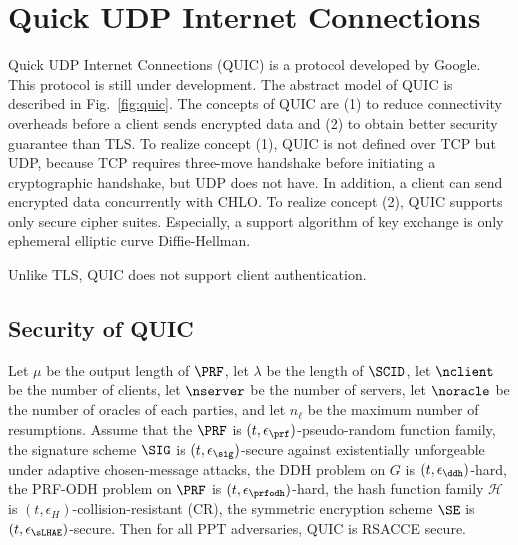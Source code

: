 \section{Quick UDP Internet Connections} \label{sec:quic}





Quick UDP Internet Connections (QUIC) is a protocol developed by Google. This protocol is still under development. The abstract model of QUIC is described in Fig.~\ref{fig:quic}. The concepts of QUIC are (1) to reduce connectivity overheads before a client sends encrypted data and (2) to obtain better security guarantee than TLS.
To realize concept (1), QUIC is not defined over TCP but UDP, because TCP requires three-move handshake before initiating a cryptographic handshake, but UDP does not have. In addition, a client can send encrypted data concurrently with CHLO.
To realize concept (2), QUIC supports only secure cipher suites. Especially, a support algorithm of key exchange is only ephemeral elliptic curve Diffie-Hellman.

Unlike TLS, QUIC does not support client authentication.

\subsection{Security of QUIC} \label{sec:quic_detail}

\begin{theorem} \label{theorem:quic}
 Let $\mu$ be the output length of $\PRF$, let $\lambda$ be the length of $\SCID$, let $\nclient$ be the number of clients, let $\nserver$ be the number of servers, let $\noracle$ be the number of oracles of each parties, and let $n_{\ell}$ be the maximum number of resumptions. Assume that the $\PRF$ is $(t, \epsilon_{\prf})$-pseudo-random function family, the signature scheme $\SIG$ is $(t, \epsilon_{\sig})$-secure against existentially unforgeable under adaptive chosen-message attacks, the DDH problem on $G$ is $(t, \epsilon_{\ddh})$-hard, the PRF-ODH problem on $\PRF$ is $(t, \epsilon_{\prfodh})$-hard, the hash function family $\mathcal{H}$ is $(t,\epsilon_{H})$-collision-resistant (CR), the symmetric encryption scheme $\SE$ is $(t, \epsilon_{\sLHAE})$-secure.
 Then for all PPT adversaries, QUIC is RSACCE secure.
\end{theorem}%

